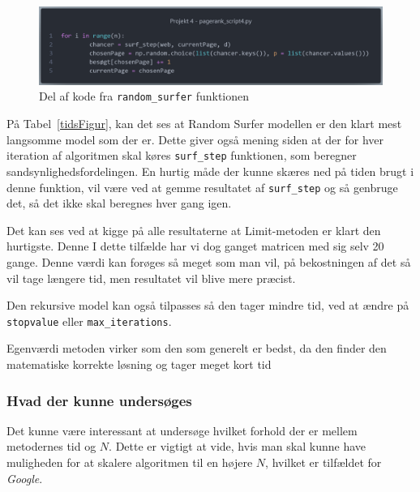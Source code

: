 \begin{figure}
    \centering
    \includegraphics[width = \linewidth]{Billeder/Kode1.png}
    \caption{Del af kode fra \texttt{random\_surfer} funktionen}
\end{figure}


På Tabel~\ref{tidsFigur}, kan det ses at Random Surfer modellen er den klart mest langsomme model som der er. Dette giver også mening siden at der for hver iteration af algoritmen skal køres \texttt{surf\_step} funktionen, som beregner sandsynlighedsfordelingen. En hurtig måde der kunne skæres ned på tiden brugt i denne funktion, vil være ved at gemme resultatet af \texttt{surf\_step} og så genbruge det, så det ikke skal beregnes hver gang igen.

Det kan ses ved at kigge på alle resultaterne at Limit-metoden er klart den hurtigste. Denne I dette tilfælde har vi dog ganget matricen med sig selv 20 gange. Denne værdi kan forøges så meget som man vil, på bekostningen af det så vil tage længere tid, men resultatet vil blive mere præcist.

Den rekursive model kan også tilpasses så den tager mindre tid, ved at ændre på \texttt{stopvalue} eller \texttt{max\_iterations}.

Egenværdi metoden virker som den som generelt er bedst, da den finder den matematiske korrekte løsning og tager meget kort tid

\subsubsection*{Hvad der kunne undersøges}
Det kunne være interessant at undersøge hvilket forhold der er mellem metodernes tid og $N$. Dette er vigtigt at vide, hvis man skal kunne have muligheden for at skalere algoritmen til en højere $N$, hvilket er tilfældet for \emph{Google}.

